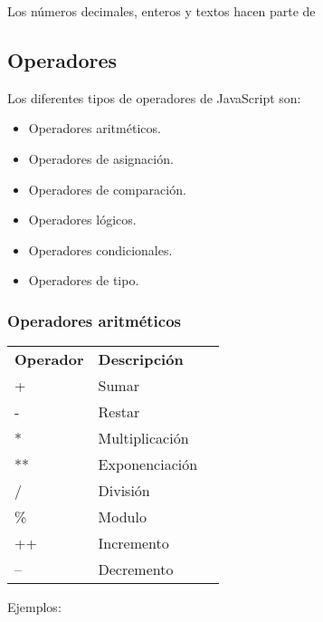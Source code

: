 Los n\'umeros decimales, enteros y textos hacen parte de


\subsection{Operadores}
Los diferentes tipos de operadores de JavaScript son: 

\begin{itemize}
    \item Operadores aritm\'eticos.
    \item Operadores de asignaci\'on.
    \item Operadores de comparaci\'on.
    \item Operadores l\'ogicos.
    \item Operadores condicionales.
    \item Operadores de tipo.
\end{itemize}
\subsubsection{Operadores aritm\'eticos}
\begin{flushleft}
\begin{spacing}{1.7}
    \begin{tabular}{p{4cm} ll}
     \textbf{Operador} & \textbf{ Descripci\'on}  \\ %
	  + & Sumar \\
	  - & Restar \\
	  * & Multiplicaci\'on\\
      ** & Exponenciaci\'on \\
      / & Divisi\'on \\
      \% & Modulo\\
      ++ & Incremento\\
      -- & Decremento 
    \end{tabular}
\end{spacing}
\end{flushleft}

Ejemplos: 


